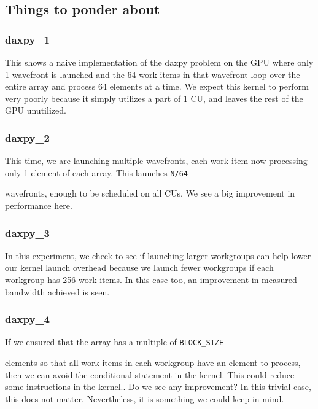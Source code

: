 \documentclass[
]{article}
\let\oldtexttt\texttt
\renewcommand{\texttt}[1]{
  \colorbox{Light}{\oldtexttt{#1}}
}
\begin{document}
\hypertarget{things-to-ponder-about}{%
\subsection{Things to ponder about}\label{things-to-ponder-about}}

\subsubsection{daxpy\_1}\label{daxpy_1}

This shows a naive implementation of the daxpy problem on the GPU where
only 1 wavefront is launched and the 64 work-items in that wavefront
loop over the entire array and process 64 elements at a time. We expect
this kernel to perform very poorly because it simply utilizes a part of
1 CU, and leaves the rest of the GPU unutilized.

\subsubsection{daxpy\_2}\label{daxpy_2}

This time, we are launching multiple wavefronts, each work-item now
processing only 1 element of each array. This launches \texttt{N/64}
wavefronts, enough to be scheduled on all CUs. We see a big improvement
in performance here.

\subsubsection{daxpy\_3}\label{daxpy_3}

In this experiment, we check to see if launching larger workgroups can
help lower our kernel launch overhead because we launch fewer workgroups
if each workgroup has 256 work-items. In this case too, an improvement
in measured bandwidth achieved is seen.

\subsubsection{daxpy\_4}\label{daxpy_4}

If we ensured that the array has a multiple of \texttt{BLOCK\_SIZE}
elements so that all work-items in each workgroup have an element to
process, then we can avoid the conditional statement in the kernel. This
could reduce some instructions in the kernel.. Do we see any
improvement? In this trivial case, this does not matter. Nevertheless,
it is something we could keep in mind.
\end{document}

